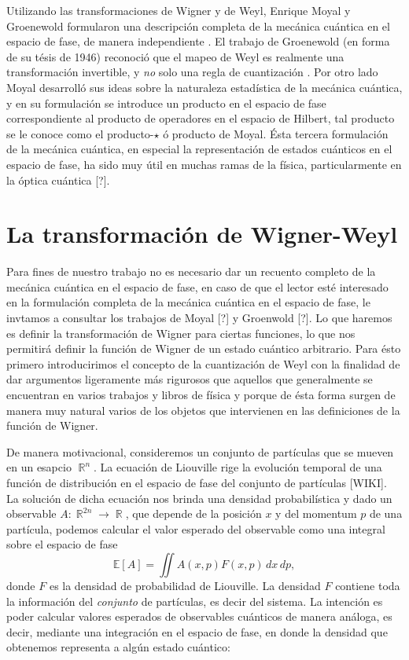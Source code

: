 \documentclass[a4paper]{report}
\DeclareMathOperator{\R}{\mathbb{R}}
\begin{document}
  Utilizando las transformaciones de Wigner y de Weyl,
  Enrique Moyal y Groenewold formularon una descripción
  completa de la mecánica cuántica en el espacio de fase, de
  manera independiente
  \cite{curtrightQuantumMechanicsPhase2012}.  El trabajo de
  Groenewold (en forma de su tésis de 1946) reconoció que el
  mapeo de Weyl es realmente una transformación invertible,
  y \textit{no} solo una regla de cuantización
  \cite{todorovQuantizationMystery2012}. Por otro lado Moyal
  desarrolló sus ideas sobre la naturaleza estadística de la
  mecánica cuántica, y en su formulación se introduce un
  producto en el espacio de fase correspondiente al producto
  de operadores en el espacio de Hilbert, tal producto se le
  conoce como el producto-$\star$ ó producto de Moyal. Ésta
  tercera formulación de la mecánica cuántica, en especial
  la representación de estados cuánticos en el espacio de
  fase, ha sido muy útil en muchas ramas de la física,
  particularmente en la óptica cuántica [?].

  \section{La transformación de Wigner-Weyl}

  Para fines de nuestro trabajo no es necesario dar un
  recuento completo de la mecánica cuántica en el espacio de
  fase, en caso de que el lector esté interesado en la
  formulación completa de la mecánica cuántica en el espacio
  de fase, le invtamos a consultar los trabajos de Moyal [?]
  y Groenwold [?]. Lo que haremos es definir la
  transformación de Wigner para ciertas funciones, lo que
  nos permitirá definir la función de Wigner de un estado
  cuántico arbitrario. Para ésto primero introducirimos el
  concepto de la cuantización de Weyl con la finalidad de
  dar argumentos ligeramente más rigurosos que aquellos que
  generalmente se encuentran en varios trabajos y libros de
  física y porque de ésta forma surgen de manera muy natural
  varios de los objetos que intervienen en las definiciones
  de la función de Wigner.

  De manera motivacional, consideremos un conjunto de
  partículas que se mueven en un esapcio $\R^{n}$. La
  ecuación de Liouville rige la evolución temporal de una
  función de distribución en el espacio de fase del conjunto
  de partículas [WIKI]. La solución de dicha ecuación nos
  brinda una densidad probabilística y dado un observable $A
  : \R^{2n} \to \R$, que depende de la posición $x$ y del
  momentum $p$ de una partícula, podemos calcular el valor
  esperado del observable como una integral sobre el espacio
  de fase
  \begin{equation}
    \mathbb E[A]
    = \iint A(x,p) F(x,p) \, dx \, dp,
  \end{equation}
  donde $F$ es la densidad de probabilidad de Liouville. La
  densidad $F$ contiene toda la información del
  \textit{conjunto} de partículas, es decir del sistema. La
  intención es poder calcular valores esperados de
  observables cuánticos de manera análoga, es decir,
  mediante una integración en el espacio de fase, en donde
  la densidad que obtenemos representa a algún estado
  cuántico:
\end{document}
